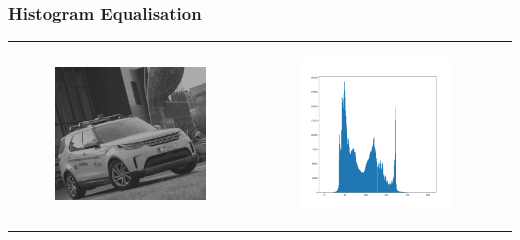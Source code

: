\begin{frame}\frametitle{Histogram Equalisation}
\begin{tabular}{ccc}
        \begin{minipage}{0.3\textwidth}
            \begin{figure}[H]

	    \includegraphics[width=\textwidth]{images/CAV15LowContrast.jpg}
    \end{figure}
        \end{minipage}
        &
        \begin{minipage}{0.3\textwidth}
            
            \begin{figure}[H]

	    \includegraphics[width=\textwidth]{images/histoLowContrast.png}
	     \end{figure}
        

\end{minipage}
\end{tabular}
\end{frame}
